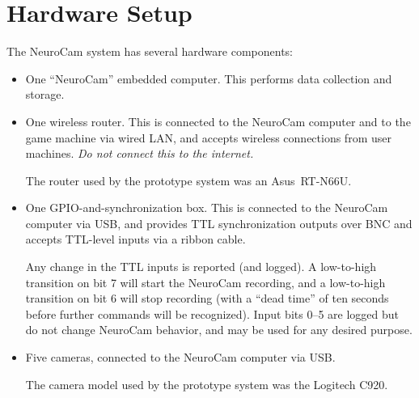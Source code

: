 
\chapter{Hardware Setup}
\label{setup}

The NeuroCam system has several hardware components:

\begin{itemize}

\item One ``NeuroCam'' embedded computer. This performs data collection and
storage.

\item One wireless router. This is connected to the NeuroCam computer and
to the game machine via wired LAN, and accepts wireless connections from
user machines. \textit{Do not connect this to the internet.}

The router used by the prototype system was an \mbox{Asus RT-N66U}.

\item One GPIO-and-synchronization box. This is connected to the NeuroCam
computer via USB, and provides TTL synchronization outputs over BNC and
accepts TTL-level inputs via a ribbon cable.

Any change in the TTL inputs is reported (and logged). A low-to-high
transition on bit 7 will start the NeuroCam recording, and a low-to-high
transition on bit 6 will stop recording (with a ``dead time'' of ten seconds
before further commands will be recognized). Input bits 0--5 are logged but
do not change NeuroCam behavior, and may be used for any desired purpose.

\item Five cameras, connected to the NeuroCam computer via USB.

The camera model used by the prototype system was the Logitech C920.

\end{itemize}

